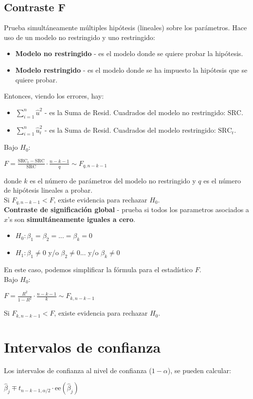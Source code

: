 \documentclass[10pt, a4paper, landscape]{extarticle}
\newcommand{\ee}{\mathrm{ee}}
\newcommand{\SRC}{\mathrm{SRC}}
\begin{document}
\begin{multicols}{3}
	\subsection*{Contraste F}
		Prueba simultáneamente múltiples hipótesis (lineales) sobre los parámetros. Hace uso de un modelo no restringido y uno restringido:
		\begin{itemize}[leftmargin=*]
			\item \textbf{Modelo no restringido} - es el modelo donde se quiere probar la hipótesis.
			\item \textbf{Modelo restringido} - es el modelo donde se ha impuesto la hipótesis que se quiere probar.
		\end{itemize}
		Entonces, viendo los errores, hay:
		\begin{itemize}[leftmargin=*]
			\item \textbf{$\sum_{i=1}^n \hat{u}^2$} - es la Suma de Resid. Cuadrados del modelo no restringido: $\SRC$.
			\item \textbf{$\sum_{i=1}^n \hat{u}_\mathrm{r}^2$} - es la Suma de Resid. Cuadrados del modelo restringido: $\SRC_\mathrm{r}$.
		\end{itemize}
		Bajo $H_0$:
		\begin{center}
			$F = \frac{\SRC_\mathrm{r} - \SRC}{\SRC} \cdot \frac{n-k-1}{q} \sim F_{q, n-k-1}$
		\end{center}
		donde $k$ es el número de parámetros del modelo no restringido y $q$ es el número de hipótesis lineales a probar. \\
		Si $F_{q, n-k-1} < F$, existe evidencia para rechazar $H_0$. \\
		\textbf{Contraste de significación global} - prueba si todos los parametros asociados a $x$'s son \textbf{simultáneamente iguales a cero}.
		\begin{itemize}[leftmargin=*]
			\item $H_0: \beta_1 = \beta_2 = ... = \beta_k = 0$
			\item $H_1: \beta_1 \neq 0$ y/o $\beta_2 \neq 0 ...$ y/o $\beta_k \neq 0$
		\end{itemize}
		En este caso, podemos simplificar la fórmula para el estadístico $F$. \\
		Bajo $H_0$:
		\begin{center}
			$F = \frac{R^2}{1 - R^2} \cdot \frac{n-k-1}{k} \sim F_{k, n-k-1}$
		\end{center}
		Si $F_{k, n-k-1} < F$, existe evidencia para rechazar $H_0$.

\section*{Intervalos de confianza}
	Los intervalos de confianza al nivel de confianza ($1 - \alpha$), se pueden calcular:
	\begin{center}
		$\hat{\beta}_j \mp t_{n-k-1, \alpha/2} \cdot \ee(\hat{\beta}_j)$
	\end{center}


\end{multicols}
\end{document}
